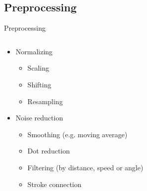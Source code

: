 \subsection{Preprocessing}
\begin{frame}{Preprocessing}
    \begin{columns}[T] %
    \begin{column}[T]{5cm} %
        \begin{itemize}
            \item<1-> Normalizing
            \begin{itemize}
                \item<2-> Scaling
                \item<2-> Shifting
                \item<3-> Resampling
            \end{itemize}
            \item<1-> Noise reduction
            \begin{itemize}
                \item<4-> Smoothing (e.g. moving average)
                \item<5-> Dot reduction
                \item<6-> Filtering (by distance, speed or angle)
                \item<7-> Stroke connection
            \end{itemize}
        \end{itemize}
    \end{column}
    \begin{column}[T]{6cm} %

\end{column}
\end{columns}
\end{frame}
